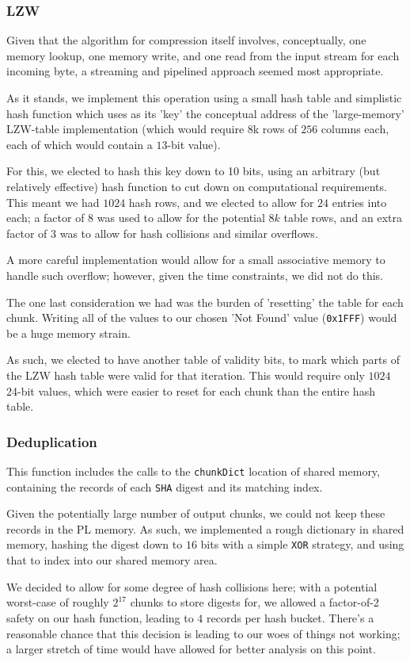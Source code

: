 \documentclass{article}
\begin{document}
\subsubsection{LZW}

Given that the algorithm for compression itself involves, conceptually, one memory lookup, one memory write, and one read from the input stream for each incoming byte,
a streaming and pipelined approach seemed most appropriate.
\par
As it stands, we implement this operation using a small hash table and simplistic hash function which uses as its 'key'
the conceptual address of the 'large-memory' LZW-table implementation (which would require 8k rows of $256$ columns each, each of which would contain a $13$-bit value).
\par
For this, we elected to hash this key down to 10 bits, using an arbitrary (but relatively effective) hash function to cut down on computational requirements.
This meant we had $1024$ hash rows, and we elected to allow for $24$ entries into each; a factor of $8$ was used to allow for the potential $8k$ table rows, and an extra factor of $3$ was to allow for hash collisions and similar overflows.
\par
A more careful implementation would allow for a small associative memory to handle such overflow; however, given the time constraints, we did not do this.
\newline\par
The one last consideration we had was the burden of 'resetting' the table for each chunk.
Writing all of the values to our chosen 'Not Found' value (\texttt{0x1FFF}) would be a huge memory strain.
\par
As such, we elected to have another table of validity bits, to mark which parts of the LZW hash table were valid for that iteration.
This would require only $1024$ 24-bit values, which were easier to reset for each chunk than the entire hash table.

\subsubsection{Deduplication}

This function includes the calls to the \texttt{chunkDict} location of shared memory, containing the records of each \texttt{SHA} digest and its matching index.
\newline\par
Given the potentially large number of output chunks, we could not keep these records in the PL memory. 
As such, we implemented a rough dictionary in shared memory, hashing the digest down to $16$ bits with a simple \texttt{XOR} strategy,
and using that to index into our shared memory area.
\par
We decided to allow for some degree of hash collisions here; with a potential worst-case of roughly $2^{17}$ chunks to store digests for,
we allowed a factor-of-2 safety on our hash function, leading to $4$ records per hash bucket. 
There's a reasonable chance that this decision
is leading to our woes of things not working; a larger stretch of time would have allowed for better analysis on this point.
\end{document}

